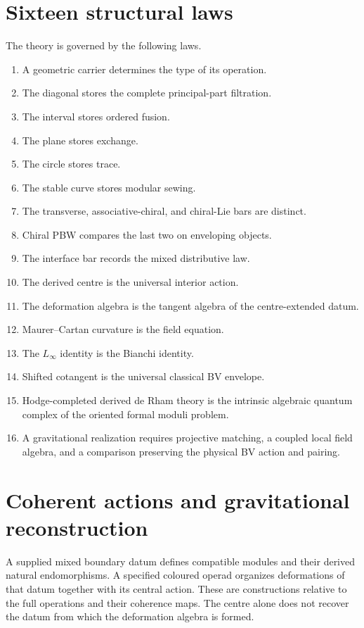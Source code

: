\chapter{Sixteen structural laws}
The theory is governed by the following laws.
\begin{enumerate}
\item A geometric carrier determines the type of its operation.
\item The diagonal stores the complete principal-part filtration.
\item The interval stores ordered fusion.
\item The plane stores exchange.
\item The circle stores trace.
\item The stable curve stores modular sewing.
\item The transverse, associative-chiral, and chiral-Lie bars are distinct.
\item Chiral PBW compares the last two on enveloping objects.
\item The interface bar records the mixed distributive law.
\item The derived centre is the universal interior action.
\item The deformation algebra is the tangent algebra of the centre-extended datum.
\item Maurer--Cartan curvature is the field equation.
\item The $L_\infty$ identity is the Bianchi identity.
\item Shifted cotangent is the universal classical BV envelope.
\item Hodge-completed derived de Rham theory is the intrinsic algebraic quantum complex of the oriented formal moduli problem.
\item A gravitational realization requires projective matching, a coupled local field algebra, and a comparison preserving the physical BV action and pairing.
\end{enumerate}

\chapter{Coherent actions and gravitational reconstruction}
A supplied mixed boundary datum defines compatible modules and their derived natural endomorphisms. A specified coloured operad organizes deformations of that datum together with its central action. These are constructions relative to the full operations and their coherence maps. The centre alone does not recover the datum from which the deformation algebra is formed.

